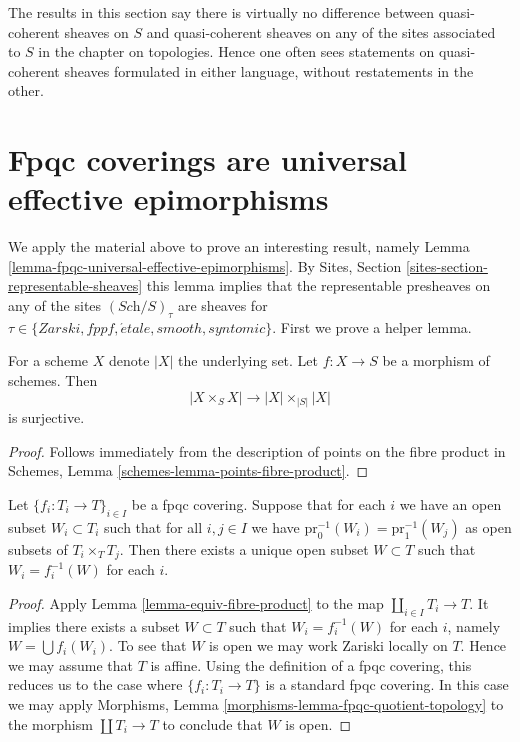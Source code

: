 \noindent
The results in this section say there is virtually no difference between
quasi-coherent sheaves on $S$ and quasi-coherent sheaves on any of the
sites associated to $S$ in the chapter on topologies. Hence one often
sees statements on quasi-coherent sheaves formulated in either language,
without restatements in the other.















\section{Fpqc coverings are universal effective epimorphisms}
\label{section-fpqc-universal-effective-epimorphisms}

\noindent
We apply the material above to prove an interesting result, namely
Lemma \ref{lemma-fpqc-universal-effective-epimorphisms}.
By Sites, Section \ref{sites-section-representable-sheaves}
this lemma implies that the representable
presheaves on any of the sites $(\textit{Sch}/S)_\tau$ are sheaves for
$\tau \in \{Zarski, fppf, \acute{e}tale, smooth, syntomic\}$. First
we prove a helper lemma.

\begin{lemma}
\label{lemma-equiv-fibre-product}
For a scheme $X$ denote $|X|$ the underlying set.
Let $f : X \to S$ be a morphism of schemes.
Then 
$$
|X \times_S X| \to |X| \times_{|S|} |X|
$$
is surjective.
\end{lemma}

\begin{proof}
Follows immediately from the description of points on the
fibre product in Schemes, Lemma \ref{schemes-lemma-points-fibre-product}.
\end{proof}

\begin{lemma}
\label{lemma-open-fpqc-covering}
Let $\{f_i : T_i \to T\}_{i \in I}$ be a fpqc covering.
Suppose that for each $i$ we have an open subset $W_i \subset T_i$
such that for all $i,j \in I$ we have
$\text{pr}_0^{-1}(W_i) = \text{pr}_1^{-1}(W_j)$ as open
subsets of $T_i \times_T T_j$. Then there exists a unique open subset
$W \subset T$ such that $W_i = f_i^{-1}(W)$ for each $i$.
\end{lemma}

\begin{proof}
Apply
Lemma \ref{lemma-equiv-fibre-product}
to the map $\coprod_{i \in I} T_i \to T$.
It implies there exists a subset $W \subset T$ such that
$W_i = f_i^{-1}(W)$ for each $i$, namely $W = \bigcup f_i(W_i)$.
To see that $W$ is open we may work Zariski locally on $T$.
Hence we may assume that $T$ is affine. Using the definition
of a fpqc covering, this reduces us to the case where
$\{f_i : T_i \to T\}$ is a standard fpqc covering. In this case we
may apply
Morphisms, Lemma \ref{morphisms-lemma-fpqc-quotient-topology}
to the morphism
$\coprod T_i \to T$ to conclude that $W$ is open.
\end{proof}

